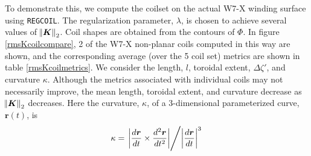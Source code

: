 \documentclass[aps,unsortedaddress]{revtex4-1}
\newcommand{\der}[2]{\dfrac{d #1}{d  #2}}
\begin{document}
To demonstrate this, we compute the coilset on the actual W7-X winding surface using \texttt{REGCOIL}. The regularization parameter, $\lambda$, is chosen to achieve several values of $\norm{\bm{K}}_2$. Coil shapes are obtained from the contours of $\Phi$. In figure \ref{rmsKcoilcompare}, 2 of the W7-X non-planar coils computed in this way are shown, and the corresponding average (over the 5 coil set) metrics are shown in table \ref{rmsKcoilmetrics}. We consider the length, $l$, toroidal extent, $\Delta \zeta'$, and curvature $\kappa$. Although the metrics associated with individual coils may not necessarily improve, the mean length, toroidal extent, and curvature decrease as $\norm{\bm{K}}_2$ decreases. Here the curvature, $\kappa$, of a 3-dimensional parameterized curve, $\bm{r}(t)$, is 
\begin{gather}
\kappa = \left. \bigg \rvert \der{\bm{r}}{t} \times \der{^2 \bm{r}}{t^2} \bigg \rvert \middle/ \bigg \rvert \der{\bm{r}}{t} \bigg \rvert^3 \right.
\end{gather}
\end{document}
